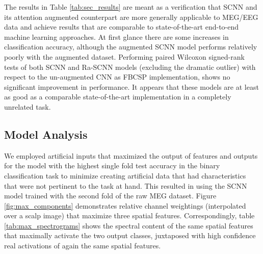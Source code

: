 \documentclass[fleqn,10pt]{wlscirep}
\begin{document}
The results in Table \ref{tab:sec_results} are meant as a verification that SCNN and its attention augmented counterpart are more generally applicable to MEG/EEG data and achieve results that are comparable to state-of-the-art end-to-end machine learning approaches. At first glance there are some increases in classification accuracy, although the augmented SCNN model performs relatively poorly with the augmented dataset. Performing paired Wilcoxon signed-rank tests of both SCNN and Ra-SCNN models (excluding the dramatic outlier) with respect to the un-augmented CNN as FBCSP implementation, shows no significant improvement in performance. It appears that these models are at least as good as a comparable state-of-the-art implementation in a completely unrelated task.

\subsection*{Model Analysis}

We employed artificial inputs that maximized the output of features and outputs for the model with the highest single fold test accuracy in the binary classification task to minimize creating artificial data that had characteristics that were not pertinent to the task at hand. This resulted in using the SCNN model trained with the second fold of the raw MEG dataset. Figure \ref{fig:max_components} demonstrates relative channel weightings (interpolated over a scalp image) that maximize three spatial features. Correspondingly, table \ref{tab:max_spectrograms} shows the spectral content of the same spatial features that maximally activate the two output classes, juxtaposed with high confidence real activations of again the same spatial features.
\end{document}
